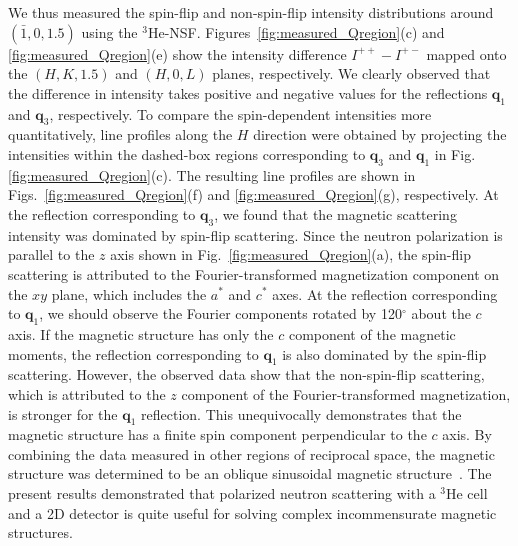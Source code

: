 \documentclass[%
 reprint,
superscriptaddress,
 amsmath,amssymb,
 aps,
floatfix,
]{revtex4-2}
\newcommand{\He}{$^3$He }
\newcommand{\Hensf}{$^3$He-NSF}
\begin{document}
We thus measured the spin-flip and non-spin-flip intensity distributions around $(\bar{1},0,1.5)$ using the \Hensf.
Figures~\ref{fig:measured_Qregion}(c) and \ref{fig:measured_Qregion}(e) show the intensity difference \(I^{++}-I^{+-}\) mapped onto the $(H,K,1.5)$ and $(H,0,L)$ planes, respectively.
We clearly observed that the difference in intensity takes positive and negative values for the reflections $\boldsymbol{q}_1$ and $\boldsymbol{q}_3$, respectively.
To compare the spin-dependent intensities more quantitatively, line profiles along the $H$ direction were obtained by projecting the intensities within the dashed-box regions corresponding to $\boldsymbol{q}_3$ and $\boldsymbol{q}_1$ in Fig.\ref{fig:measured_Qregion}(c).
The resulting line profiles are shown in Figs.~\ref{fig:measured_Qregion}(f) and \ref{fig:measured_Qregion}(g), respectively.
At the reflection corresponding to $\boldsymbol{q}_3$, we found that the magnetic scattering intensity was dominated by spin-flip scattering.
Since the neutron polarization is parallel to the $z$ axis shown in Fig.~\ref{fig:measured_Qregion}(a), the spin-flip scattering is attributed to the Fourier-transformed magnetization component on the $xy$ plane, which includes the $a^*$ and $c^*$ axes. %
At the reflection corresponding to $\boldsymbol{q}_1$, we should observe the Fourier components rotated by 120$^{\circ}$ about the $c$ axis.
If the magnetic structure has only the $c$ component of the magnetic moments, the reflection corresponding to $\boldsymbol{q}_1$ is also dominated by the spin-flip scattering.
However, the observed data show that the non-spin-flip scattering, which is attributed to the $z$ component of the Fourier-transformed magnetization, is stronger for the $\boldsymbol{q}_1$ reflection. %
This unequivocally demonstrates that the magnetic structure has a finite spin component perpendicular to the $c$ axis. %
By combining the data measured in other regions of reciprocal space, the magnetic structure was determined to be an oblique sinusoidal magnetic structure~\cite{Osawa_tbp}. %
The present results demonstrated that polarized neutron scattering with a \He cell and a 2D detector is quite useful for solving complex incommensurate magnetic structures.
\end{document}
